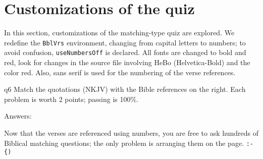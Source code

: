 \documentclass[11pt]{article}
\def\cs#1{\texttt{\eqbs#1}}
\let\env\texttt
\begin{document}
\section*{Customizations of the quiz}

In this section, customizations of the matching-type quiz are explored. We
redefine the \env{BblVrs} environment, changing from capital letters to
numbers; to avoid confusion, \cs{useNumbersOff} is declared. All fonts are
changed to bold and red, look for changes in the source file involving
\textsf{HeBo} (Helvetica-Bold) and the color red. Also, sans serif is used
for the numbering of the verse references.

\makeatletter
\renewenvironment{BblVrs}{%
  \renewcommand{\theeqquestionnoi}{\arabic{eqquestionnoi}}%
  \renewcommand{\labeleqquestionnoi}{%
    \color{\eq@quesNumCol}\sffamily\bfseries\theeqquestionnoi}%
    \eqfQorS
}{}
\makeatother
{}

\begin{quiz*}{q6}
Match the quotations (\textsf{NKJV)} with the Bible references on the right.
Each problem is worth 2 points; passing is 100\%.

\useMCCircles

\noindent
\begin{minipage}[t]{.75\linewidth}
\begin{questions}
\useNumbersOff
\begin{BblPsg}
  \item{}
  \item{}
  \item{}
\end{BblPsg}
\end{questions}
\end{minipage}
\hfill
\begin{minipage}[t][0pt]{.25\linewidth-1em}
\begin{questions}[itemsep={0pt},labelwidth={.5em}]
\begin{BblVrs}
  \item{}
  \item{}
  \item{}
  \item{}
  \item{}
  \item{}
\end{BblVrs}
\end{questions}
\end{minipage}\hfill
\par\medskip

\end{quiz*}\quad\PointsField\currQuiz\olBdry\CorrButton\currQuiz\cgBdry[6pt]
Answers: \vcgBdry[6pt]

Now that the verses are referenced using numbers, you are free to ask hundreds of Biblical
matching questions; the only problem is arranging them on the page. \verb~:-{)~
\end{document}
